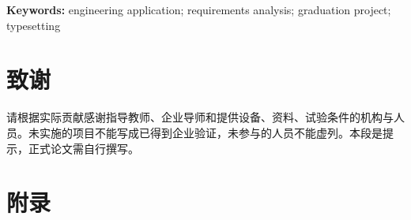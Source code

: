 \documentclass[12pt,a4paper,fontset=none]{ctexart}
\begin{document}
\par\medskip\noindent\textbf{Keywords:} engineering application; requirements analysis; graduation project; typesetting
\clearpage\tableofcontents
\clearpage{}

\clearpage\begingroup
\renewcommand{\bibsection}{\section*{参考文献}\addcontentsline{toc}{section}{参考文献}}
\renewcommand{\bibfont}{\songti\zihao{5}\setstretch{1}}

\endgroup
\clearpage\section*{致\quad 谢}
请根据实际贡献感谢指导教师、企业导师和提供设备、资料、试验条件的机构与人员。未实施的项目不能写成已得到企业验证，未参与的人员不能虚列。本段是提示，正式论文需自行撰写。
\clearpage\section*{附\quad 录}

\end{document}
